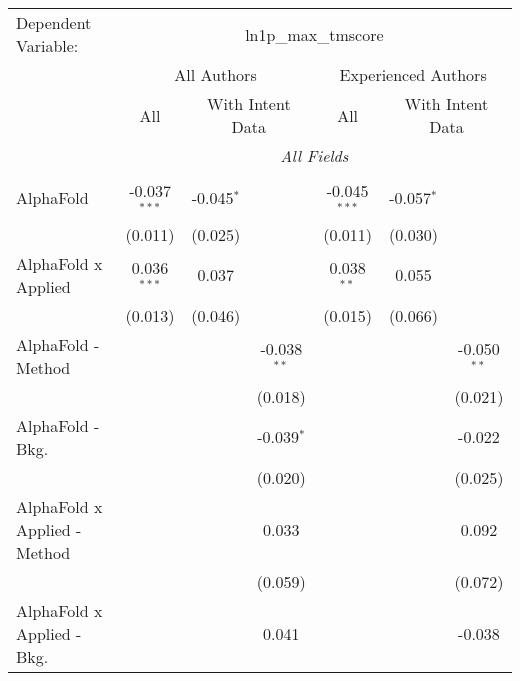 \begingroup
\centering
\begin{tabular}{lcccccc}
   \tabularnewline \midrule \midrule
   Dependent Variable: & \multicolumn{6}{c}{ln1p\_max\_tmscore}\\
 & \multicolumn{3}{c}{All Authors} & \multicolumn{3}{c}{Experienced Authors} \\
\cmidrule(lr){2-4} \cmidrule(lr){5-7}
 & \multicolumn{1}{c}{All} & \multicolumn{2}{c}{With Intent Data} & \multicolumn{1}{c}{All} & \multicolumn{2}{c}{With Intent Data} \\
\cmidrule(lr){2-2} \cmidrule(lr){3-4} \cmidrule(lr){5-5} \cmidrule(lr){6-7}
 & \multicolumn{6}{c}{\textit{All Fields}} \\ \\
   AlphaFold                      & -0.037$^{***}$ & -0.045$^{*}$  &               & -0.045$^{***}$ & -0.057$^{*}$  &   \\   
                                  & (0.011)        & (0.025)       &               & (0.011)        & (0.030)       &   \\   
   AlphaFold x Applied            & 0.036$^{***}$  & 0.037         &               & 0.038$^{**}$   & 0.055         &   \\   
                                  & (0.013)        & (0.046)       &               & (0.015)        & (0.066)       &   \\   
   AlphaFold - Method             &                &               & -0.038$^{**}$ &                &               & -0.050$^{**}$\\   
                                  &                &               & (0.018)       &                &               & (0.021)\\   
   AlphaFold - Bkg.               &                &               & -0.039$^{*}$  &                &               & -0.022\\   
                                  &                &               & (0.020)       &                &               & (0.025)\\   
   AlphaFold x Applied - Method   &                &               & 0.033         &                &               & 0.092\\   
                                  &                &               & (0.059)       &                &               & (0.072)\\   
   AlphaFold x Applied - Bkg.     &                &               & 0.041         &                &               & -0.038\\   

\end{tabular}
